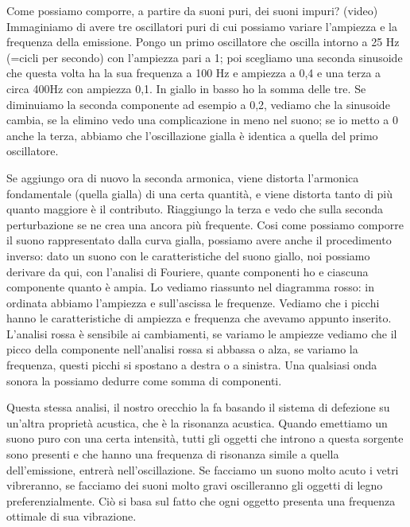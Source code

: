\documentclass[a4paper,12pt]{article}
\begin{document}
Come possiamo comporre, a partire da suoni puri, dei suoni impuri? 
(video) Immaginiamo di avere tre oscillatori puri di cui possiamo variare l'ampiezza e la frequenza della emissione. Pongo un primo oscillatore che oscilla intorno a 25 Hz (=cicli per secondo) con l'ampiezza pari a 1; poi scegliamo una seconda sinusoide che questa volta ha la sua frequenza a 100 Hz e ampiezza a 0,4 e una terza a circa 400Hz con ampiezza 0,1. In giallo in basso ho la somma delle tre. Se diminuiamo la seconda componente ad esempio a 0,2, vediamo che la sinusoide cambia, se la elimino vedo una complicazione in meno nel suono; se io metto a 0 anche la terza, abbiamo che l'oscillazione gialla è identica a quella del primo oscillatore. 

Se aggiungo ora di nuovo la seconda armonica, viene distorta l'armonica fondamentale (quella gialla) di una certa quantità, e viene distorta tanto di più quanto maggiore è il contributo. Riaggiungo la terza e vedo che sulla seconda perturbazione se ne crea una ancora più frequente. Cosi come possiamo comporre il suono rappresentato dalla curva gialla, possiamo avere anche il procedimento inverso: dato un suono con le caratteristiche del suono giallo, noi possiamo derivare da qui, con l'analisi di Fouriere, quante componenti ho e ciascuna componente quanto è ampia. Lo vediamo riassunto nel diagramma rosso: in ordinata abbiamo l'ampiezza e sull'ascissa le frequenze. Vediamo che i picchi hanno le caratteristiche di ampiezza e frequenza che avevamo appunto inserito. L'analisi rossa è sensibile ai cambiamenti, se variamo le ampiezze vediamo che il picco della componente nell'analisi rossa si abbassa o alza, se variamo la frequenza, questi picchi si spostano a destra o a sinistra. Una qualsiasi onda sonora la possiamo dedurre come somma di componenti. 

Questa stessa analisi, il nostro orecchio la fa basando il sistema di defezione su un'altra proprietà acustica, che è la risonanza acustica. Quando emettiamo un suono puro con una certa intensità, tutti gli oggetti che introno a questa sorgente sono presenti e che hanno una frequenza di risonanza simile a quella dell'emissione, entrerà nell'oscillazione. Se facciamo un suono molto acuto i vetri vibreranno, se facciamo dei suoni molto gravi oscilleranno gli oggetti di legno preferenzialmente. Ciò si basa sul fatto che ogni oggetto presenta una frequenza ottimale di sua vibrazione. 
\end{document}
